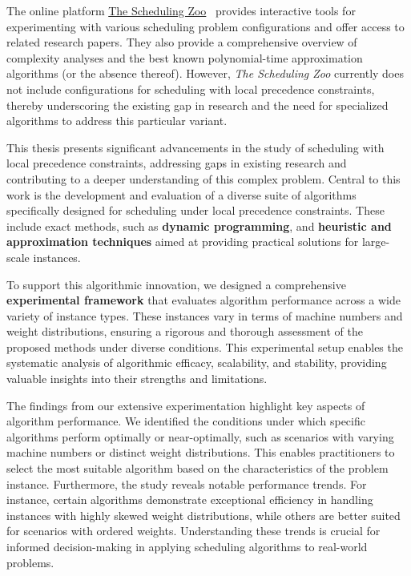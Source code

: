 The online platform \href{http://schedulingzoo.lip6.fr/}{The Scheduling Zoo}~\cite{SchedulingZoo} provides interactive tools for experimenting with various scheduling problem configurations and offer access to related research papers. They also provide a comprehensive overview of complexity analyses and the best known polynomial-time approximation algorithms (or the absence thereof). However, \textit{The Scheduling Zoo} currently does not include configurations for scheduling with local precedence constraints, thereby underscoring the existing gap in research and the need for specialized algorithms to address this particular variant. \hfill \break

This thesis presents significant advancements in the study of scheduling with local precedence constraints, addressing gaps in existing research and contributing to a deeper understanding of this complex problem. Central to this work is the development and evaluation of a diverse suite of algorithms specifically designed for scheduling under local precedence constraints. These include exact methods, such as \textbf{dynamic programming}, and \textbf{heuristic and approximation techniques} aimed at providing practical solutions for large-scale instances.

To support this algorithmic innovation, we designed a comprehensive \textbf{experimental framework} that evaluates algorithm performance across a wide variety of instance types. These instances vary in terms of machine numbers and weight distributions, ensuring a rigorous and thorough assessment of the proposed methods under diverse conditions. This experimental setup enables the systematic analysis of algorithmic efficacy, scalability, and stability, providing valuable insights into their strengths and limitations.

The findings from our extensive experimentation highlight key aspects of algorithm performance. We identified the conditions under which specific algorithms perform optimally or near-optimally, such as scenarios with varying machine numbers or distinct weight distributions. This enables practitioners to select the most suitable algorithm based on the characteristics of the problem instance. Furthermore, the study reveals notable performance trends. For instance, certain algorithms demonstrate exceptional efficiency in handling instances with highly skewed weight distributions, while others are better suited for scenarios with ordered weights. Understanding these trends is crucial for informed decision-making in applying scheduling algorithms to real-world problems.

